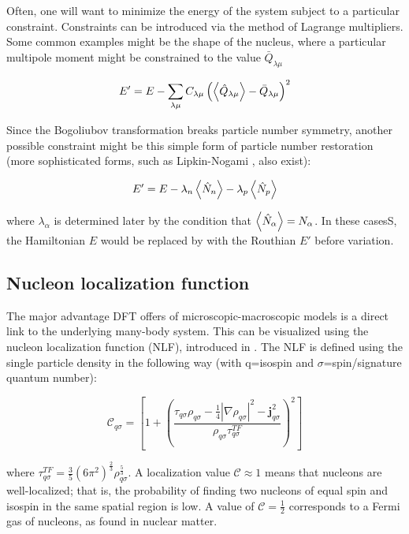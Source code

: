 
Often, one will want to minimize the energy of the system subject to a particular constraint. Constraints can be introduced via the method of Lagrange multipliers. Some common examples might be the shape of the nucleus, where a particular multipole moment might be constrained to the value $\bar{Q}_{\lambda\mu}$

\begin{equation}
E' = E - \sum_{\lambda\mu} C_{\lambda\mu} \left(\expval{\hat{Q}_{\lambda\mu}} - \bar{Q}_{\lambda\mu}\right)^2
\end{equation}

\noindent Since the Bogoliubov transformation breaks particle number symmetry, another possible constraint might be this simple form of particle number restoration (more sophisticated forms, such as Lipkin-Nogami \cite{Lipkin1960, Nogami1964, Pradhan1973, Flocard1997}, also exist):

\begin{equation}
E' = E - \lambda_n \expval{\hat{N}_n} - \lambda_p \expval{\hat{N}_p}
\end{equation}

\noindent where $\lambda_\alpha$ is determined later by the condition that $\expval{\hat{N}_\alpha} = N_\alpha$. In these casesS, the Hamiltonian $E$ would be replaced by with the Routhian $E'$ before variation. %

\subsection{Nucleon localization function}\label{sect:locali}
The major advantage DFT offers of microscopic-macroscopic models is a direct link to the underlying many-body system. This can be visualized using the nucleon localization function (NLF), introduced in \cite{Reinhard2011,Zhang2016}. The NLF is defined using the single particle density in the following way (with q=isospin and $\sigma$=spin/signature quantum number):

\begin{equation}
\mathcal{C}_{q\sigma} = \left[1+\left(\frac{\tau_{q\sigma}\rho_{q\sigma}-\frac{1}{4}|\nabla\rho_{q\sigma}|^2-\mathbf{j}^2_{q\sigma}}{\rho_{q\sigma}\tau_{q\sigma}^{TF}}\right)^2\right]
\end{equation}

\noindent where $\tau_{q\sigma}^{TF}=\frac{3}{5}(6\pi^2)^\frac{2}{3}\rho_{q\sigma}^\frac{5}{3}$. A localization value $\mathcal{C} \approx 1$ means that nucleons are well-localized; that is, the probability of finding two nucleons of equal spin and isospin in the same spatial region is low. A value of $\mathcal{C}=\frac{1}{2}$ corresponds to a Fermi gas of nucleons, as found in nuclear matter.

